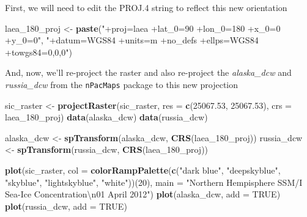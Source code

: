 \documentclass[]{article}
\newenvironment{Shaded}{}{}
\newcommand{\KeywordTok}[1]{\textcolor[rgb]{0.00,0.44,0.13}{\textbf{{#1}}}}
\newcommand{\DataTypeTok}[1]{\textcolor[rgb]{0.56,0.13,0.00}{{#1}}}
\newcommand{\DecValTok}[1]{\textcolor[rgb]{0.25,0.63,0.44}{{#1}}}
\newcommand{\FloatTok}[1]{\textcolor[rgb]{0.25,0.63,0.44}{{#1}}}
\newcommand{\CharTok}[1]{\textcolor[rgb]{0.25,0.44,0.63}{{#1}}}
\newcommand{\StringTok}[1]{\textcolor[rgb]{0.25,0.44,0.63}{{#1}}}
\newcommand{\OtherTok}[1]{\textcolor[rgb]{0.00,0.44,0.13}{{#1}}}
\newcommand{\NormalTok}[1]{{#1}}
\begin{document}
First, we will need to edit the PROJ.4 string to reflect this new
orientation

\begin{Shaded}
\begin{Highlighting}[]
\NormalTok{laea_180_proj <- }\KeywordTok{paste}\NormalTok{(}\StringTok{"+proj=laea +lat_0=90 +lon_0=180 +x_0=0 +y_0=0"}\NormalTok{, }
    \StringTok{"+datum=WGS84 +units=m +no_defs +ellps=WGS84 +towgs84=0,0,0"}\NormalTok{)}
\end{Highlighting}
\end{Shaded}
And, now, we'll re-project the raster and also re-project the
\emph{alaska\_dcw} and \emph{russia\_dcw} from the \texttt{nPacMaps}
package to this new projection

\begin{Shaded}
\begin{Highlighting}[]
\NormalTok{sic_raster <- }\KeywordTok{projectRaster}\NormalTok{(sic_raster, }\DataTypeTok{res =} \KeywordTok{c}\NormalTok{(}\FloatTok{25067.53}\NormalTok{, }\FloatTok{25067.53}\NormalTok{), }
    \DataTypeTok{crs =} \NormalTok{laea_180_proj)}
\KeywordTok{data}\NormalTok{(alaska_dcw)}
\KeywordTok{data}\NormalTok{(russia_dcw)}

\NormalTok{alaska_dcw <- }\KeywordTok{spTransform}\NormalTok{(alaska_dcw, }\KeywordTok{CRS}\NormalTok{(laea_180_proj))}
\NormalTok{russia_dcw <- }\KeywordTok{spTransform}\NormalTok{(russia_dcw, }\KeywordTok{CRS}\NormalTok{(laea_180_proj))}
\end{Highlighting}
\end{Shaded}
\begin{Shaded}
\begin{Highlighting}[]
\KeywordTok{plot}\NormalTok{(sic_raster, }\DataTypeTok{col =} \KeywordTok{colorRampPalette}\NormalTok{(}\KeywordTok{c}\NormalTok{(}\StringTok{"dark blue"}\NormalTok{, }\StringTok{"deepskyblue"}\NormalTok{, }
    \StringTok{"skyblue"}\NormalTok{, }\StringTok{"lightskyblue"}\NormalTok{, }\StringTok{"white"}\NormalTok{))(}\DecValTok{20}\NormalTok{), }\DataTypeTok{main =} \StringTok{"Northern Hempisphere SSM/I Sea-Ice Concentration}\CharTok{\textbackslash{}n}\StringTok{01 April 2012"}\NormalTok{)}
\KeywordTok{plot}\NormalTok{(alaska_dcw, }\DataTypeTok{add =} \OtherTok{TRUE}\NormalTok{)}
\KeywordTok{plot}\NormalTok{(russia_dcw, }\DataTypeTok{add =} \OtherTok{TRUE}\NormalTok{)}
\end{Highlighting}
\end{Shaded}
\end{document}
